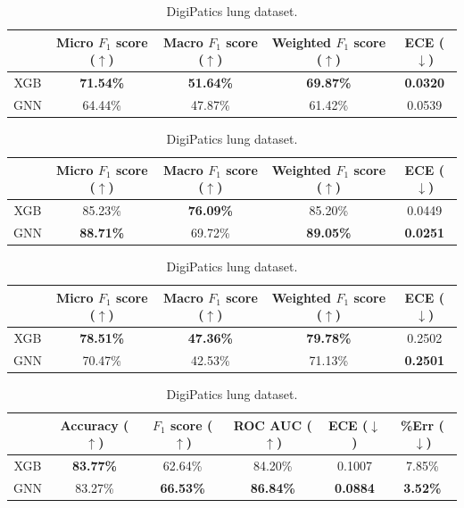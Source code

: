\begin{table}[ht]
    \centering
    \caption{Result of the GNN vs XGBoost experiment.}
    \begin{tabular}{c|c|c|c|c|}
  \cline{2-5}
  & Micro $F_1$ score ($\uparrow$) & Macro $F_1$ score ($\uparrow$) & Weighted $F_1$ score ($\uparrow$) & ECE ($\downarrow$) \\ \hline
\multicolumn{1}{|c|}{XGB}  & \textbf{71.54\%} & \textbf{51.64\%} & \textbf{69.87\%} & \textbf{0.0320} \\ \hline
\multicolumn{1}{|c|}{GNN}  & 64.44\% & 47.87\% & 61.42\% & 0.0539  \\ \hline
\end{tabular}
\caption{CoNSeP dataset.}

\vspace{0.5cm}

\begin{tabular}{c|c|c|c|c|}
  \cline{2-5}
  & Micro $F_1$ score ($\uparrow$) & Macro $F_1$ score ($\uparrow$) & Weighted $F_1$ score ($\uparrow$) & ECE ($\downarrow$) \\ \hline
\multicolumn{1}{|c|}{XGB}  & 85.23\% & \textbf{76.09\%} & 85.20\% & 0.0449 \\ \hline
\multicolumn{1}{|c|}{GNN}  & \textbf{88.71\%} & 69.72\% & \textbf{89.05\%} & \textbf{0.0251} \\ \hline
\end{tabular}
\caption{MoNuSAC dataset.}

\vspace{0.5cm}

\begin{tabular}{c|c|c|c|c|}
  \cline{2-5}
  & Micro $F_1$ score ($\uparrow$) & Macro $F_1$ score ($\uparrow$) & Weighted $F_1$ score ($\uparrow$) & ECE ($\downarrow$)  \\ \hline
\multicolumn{1}{|c|}{XGB}  & \textbf{78.51\%} & \textbf{47.36\%} & \textbf{79.78\%} & 0.2502   \\ \hline
\multicolumn{1}{|c|}{GNN}  & 70.47\% & 42.53\% & 71.13\% & \textbf{0.2501}   \\ \hline
\end{tabular}
\caption{DigiPatics breast dataset.}

\vspace{0.5cm}

\begin{tabular}{c|c|c|c|c|c|}
  \cline{2-6}
  & Accuracy ($\uparrow$) & $F_1$ score ($\uparrow$) & ROC AUC ($\uparrow$) & ECE ($\downarrow$) & \%Err ($\downarrow$) \\ \hline
\multicolumn{1}{|c|}{XGB}  & \textbf{83.77\%} & 62.64\% & 84.20\% & 0.1007 & 7.85\% \\ \hline
\multicolumn{1}{|c|}{GNN}  & 83.27\% & \textbf{66.53\%} & \textbf{86.84\%} & \textbf{0.0884} & \textbf{3.52\%} \\ \hline
\end{tabular}
\caption{DigiPatics lung dataset.}
    \label{tab:gnn-xgb}
\end{table}

